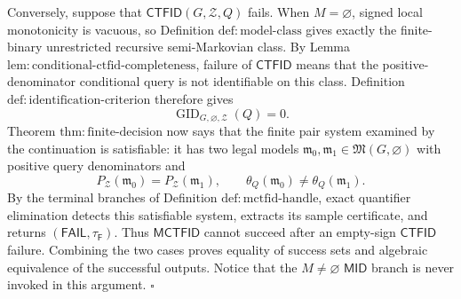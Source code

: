 Conversely, suppose that \(\mathsf{CTFID}(G,\mathcal Z,Q)\) fails. When \(M=\varnothing\), signed local monotonicity is vacuous, so Definition \(\mathrm{def:model\text{-}class}\) gives exactly the finite-binary unrestricted recursive semi-Markovian class. By Lemma \(\mathrm{lem:conditional\text{-}ctfid\text{-}completeness}\), failure of \(\mathsf{CTFID}\) means that the positive-denominator conditional query is not identifiable on this class. Definition \(\mathrm{def:identification\text{-}criterion}\) therefore gives
\[
 \operatorname{GID}_{G,\varnothing,\mathcal Z}(Q)=0.
\]
Theorem \(\mathrm{thm:finite\text{-}decision}\) now says that the finite pair system examined by the continuation is satisfiable: it has two legal models \(\mathfrak m_0,\mathfrak m_1\in\mathfrak M(G,\varnothing)\) with positive query denominators and
\[
 P_{\mathcal Z}(\mathfrak m_0)=P_{\mathcal Z}(\mathfrak m_1),
 \qquad
 \theta_Q(\mathfrak m_0)\ne\theta_Q(\mathfrak m_1).
\]
By the terminal branches of Definition \(\mathrm{def:mctfid\text{-}handle}\), exact quantifier elimination detects this satisfiable system, extracts its sample certificate, and returns \((\mathsf{FAIL},\tau_{\mathsf F})\). Thus \(\mathsf{MCTFID}\) cannot succeed after an empty-sign \(\mathsf{CTFID}\) failure. Combining the two cases proves equality of success sets and algebraic equivalence of the successful outputs. Notice that the \(M\ne\varnothing\) \(\mathsf{MID}\) branch is never invoked in this argument. \(\square\)